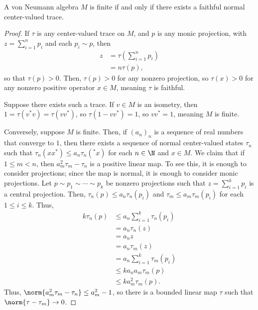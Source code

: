 \documentclass[10pt]{mypackage}
\begin{document}
\begin{theorem}
  A von Neumann algebra $M$ is finite if and only if there exists a faithful normal center-valued trace.
\end{theorem}
\begin{proof}
  If $\tau$ is any center-valued trace on $M$, and $p$ is any monic projection, with $z = \sum_{i=1}^{n}p_i$ and each $p_i\sim p$, then
  \begin{align*}
    z &= \tau\left( \sum_{i=1}^{n}p_i \right)\\
      &= n\tau\left( p \right),
  \end{align*}
  so that $\tau(p) > 0$. Then, $\tau(p) > 0$ for any nonzero projection, so $\tau(x) > 0$ for any nonzero positive operator $x\in M$, meaning $\tau$ is faithful.

  Suppose there exists such a trace. If $v\in M$ is an isometry, then $1 = \tau\left( v^{\ast}v \right) = \tau\left( vv^{\ast} \right)$, so $\tau\left( 1-vv^{\ast} \right) = 1$, so $vv^{\ast} = 1$, meaning $M$ is finite.

  Conversely, suppose $M$ is finite. Then, if $\left( a_n \right)_n$ is a sequence of real numbers that converge to $1$, then there exists a sequence of normal center-valued states $\tau_n$ such that $\tau_n\left( xx^{\ast} \right)\leq a_n\tau_n\left( ^{\ast}x \right)$ for each $n\in \N$ and $x\in M$. We claim that if $1\leq m < n$, then $a_m^2 \tau_m - \tau_n$ is a positive linear map. To see this, it is enough to consider projections; since the map is normal, it is enough to consider monic projections. Let $p\sim p_1\sim \cdots \sim p_k$ be nonzero projections such that $z = \sum_{i=1}^{k}p_i$ is a central projection. Then, $\tau_n(p)\leq a_n\tau_n\left( p_i \right)$ and $\tau_m \leq a_m\tau_m\left( p_i \right)$ for each $1\leq i \leq k$. Thus,
  \begin{align*}
    k\tau_n\left( p \right) &\leq a_n\sum_{i=1}^{k}\tau_n\left( p_i \right)\\
                            &= a_n\tau_n\left( z \right)\\
                            &= a_n z\\
                            &= a_n\tau_m\left( z \right)\\
                            &= a_n\sum_{i=1}^{k}\tau_m\left( p_i \right)\\
                            &\leq ka_na_m\tau_m\left( p \right)\\
                            &\leq ka_m^2\tau_m\left( p \right).
  \end{align*}
  Thus, $\norm{a_m^2\tau_m-\tau_n}\leq a_m^2-1$, so there is a bounded linear map $\tau$ such that $\norm{\tau-\tau_m}\rightarrow 0$.


\end{proof}
\end{document}
